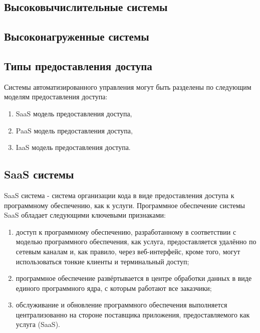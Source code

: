 \subsection{Высоковычислительные системы}\label{sec:ch2/sec1/sub5}


\subsection{Высоконагруженные системы}\label{sec:ch2/sec1/sub6}


\subsection{Типы предоставления доступа}\label{sec:ch2/sec1/sub7}

Системы автоматизированного управления могут быть разделены по следующим моделям предоставления доступа:
\begin{enumerate}
	\item SaaS модель предоставления доступа,
	\item PaaS модель предоставления доступа,
	\item IaaS модель предоставления доступа.
\end{enumerate}

\subsection{SaaS системы}\label{sec:ch2/sec1/sub8} 

SaaS система - система организации кода в виде предоставления доступа к программному обеспечению, как к услуги. 
Программное обеспечение системы SaaS обладает следующими ключевыми признаками:
\begin{enumerate}
    \item доступ к программному обеспечению, разработанному в соответствии с моделью программного обеспечения, как услуга, предоставляется удалённо по сетевым каналам и, как правило, через веб-интерфейс, кроме того, могут использоваться тонкие клиенты и терминальный доступ;
    \item программное обеспечение развёртывается в центре обработки данных в виде единого программного ядра, с которым работают все заказчики;
    \item обслуживание и обновление программного обеспечения выполняется централизованно на стороне поставщика приложения, предоставляемого как услуга (SaaS).
\end{enumerate}

